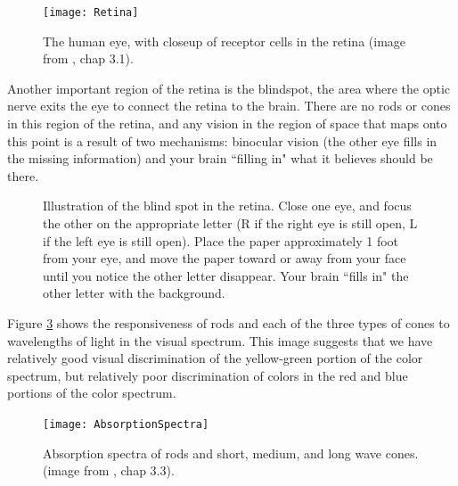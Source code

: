 \documentclass[11pt]{isuthesis}\usepackage[]{graphicx}\usepackage[]{color}
\begin{document}
\begin{figure}
\centering
\texttt{[image: Retina]}
\caption[The human eye, with closeup of receptor cells in the retina]{The human eye, with closeup of receptor cells in the retina (image from \protect\citealt{goldstein}, chap 3.1).} \label{fig:retina}
\end{figure}

Another important region of the retina is the blindspot, the area where the optic nerve exits the eye to connect the retina to the brain. There are no rods or cones in this region of the retina, and any vision in the region of space that maps onto this point is a result of two mechanisms: binocular vision (the other eye fills in the missing information) and your brain ``filling in" what it believes should be there.

\begin{figure}[htbp]\centering
\begin{center}
\end{center}
\caption[Blind Spot]{Illustration of the blind spot in the retina. Close one eye, and focus the other on the appropriate letter (R if the right eye is still open, L if the left eye is still open). Place the paper approximately 1 foot from your eye, and move the paper toward or away from your face until you notice the other letter disappear. Your brain ``fills in" the other letter with the background.}\label{fig:blindspot}
\end{figure}

Figure \ref{fig:ColorRange} shows the responsiveness of rods and each of the three types of cones to wavelengths of light in the visual spectrum. This image suggests that we have relatively good visual discrimination of the yellow-green portion of the color spectrum, but relatively poor discrimination of colors in the red and blue portions of the color spectrum. 

\begin{figure}[htbp]\centering
\texttt{[image: AbsorptionSpectra]}
\caption[Absorption spectra of retinal cells]{Absorption spectra of rods and short, medium, and long wave cones. (image from \protect\citealt{goldstein}, chap 3.3).} \label{fig:ColorRange}
\end{figure}
\end{document}
